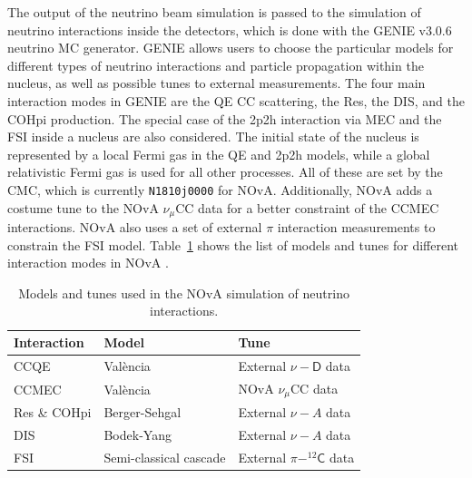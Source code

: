 
The output of the neutrino beam simulation is passed to the simulation of neutrino interactions inside the detectors, which is done with the GENIE v3.0.6~\cite{GENIE.pdf} neutrino \gls{MC} generator. GENIE allows users to choose the particular models for different types of neutrino interactions and particle propagation within the nucleus, as well as possible tunes to external measurements. The four main interaction modes in GENIE are the \gls{QE} \gls{CC} scattering, the \gls{Res}, the \gls{DIS}, and the \gls{COHpi} production. The special case of the \gls{2p2h} interaction via \gls{MEC} and the \gls{FSI} inside a nucleus are also considered. The initial state of the nucleus is represented by a local Fermi gas in the \gls{QE} and {2p2h} models, while a global relativistic Fermi gas is used for all other processes. All of these are set by the \gls{CMC}, which is currently \texttt{N1810j0000} for \gls{NOvA}. Additionally, \gls{NOvA} adds a costume tune to the \gls{NOvA} $\nu_\mu$\gls{CC} data for a better constraint of the \gls{CC}\gls{MEC} interactions. \gls{NOvA} also uses a set of external $\pi$ interaction measurements to constrain the \gls{FSI} model. Table~\ref{tab:NuIntSimulationModels} shows the list of models and tunes for different interaction modes in \gls{NOvA} \cite{NOvAResults2021.pdf}.

\begin{table}[!ht]
\centering
\caption{Models and tunes used in the NOvA simulation of neutrino interactions.}
\begin{tabular}{|l|l|l|}
\hline
Interaction & Model                  & Tune\\\hline
\gls{CC}\gls{QE} & Val\`{e}ncia \cite{ValenciaModel_NOvACCQE_2004.pdf} & External $\nu-\textsf{D}$ data \cite{NuDeuteriumScattering_NOvACCQETune_2016.pdf}\\
\gls{CC}\gls{MEC} & Val\`{e}ncia \cite{ValenciaModel_NOvACCQEMEC_2011.pdf,ValenciaModel_NOvAMEC_2013.pdf} & \gls{NOvA} $\nu_\mu$\gls{CC} data\\
\gls{Res} \& \gls{COHpi} & Berger-Sehgal \cite{BergerSehgal_ResonancePionProd_2007.pdf,BergerSehgalModel_CohPionProd_2009.pdf}          & External $\nu-A$ data\\
\gls{DIS} & Bodek-Yang \cite{BodekYangModel_NOvADIS_2003.pdf,HadronizationModelForNuDIS_NOvADIS_1988.pdf}            & External $\nu-A$ data\\
\gls{FSI} & Semi-classical cascade \cite{FSIModel_hNSemiClassicalCascade_1988.pdf} & External $\pi-^{12}\textsf{C}$ data\\\hline
\end{tabular}
\label{tab:NuIntSimulationModels}
\end{table}

